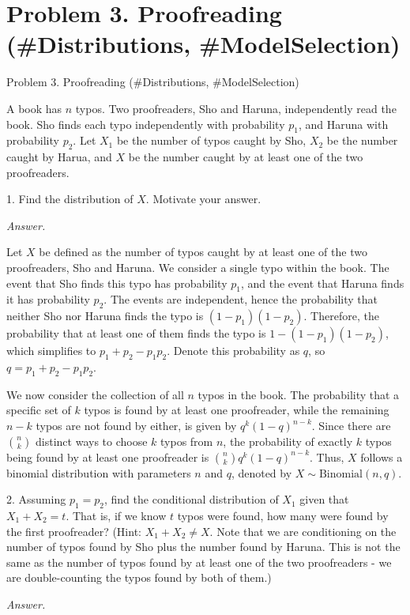 \documentclass[12pt]{article}
\begin{document}
\newpage
\section*{Problem 3. Proofreading (\#Distributions, \#ModelSelection)}

Problem 3. Proofreading (\#Distributions, \#ModelSelection)

A book has \(n\) typos. Two proofreaders, Sho and Haruna, independently read the book. Sho finds each typo independently with probability \(p_1\), and Haruna with probability \(p_2\). Let \(X_1\) be the number of typos caught by Sho, \(X_2\) be the number caught by Harua, and \(X\) be the number caught by at least one of the two proofreaders.

\begin{q}
1. Find the distribution of \(X\). Motivate your answer.
\end{q}
\textit{Answer.}

Let \( X \) be defined as the number of typos caught by at least one of the two proofreaders, Sho and Haruna. We consider a single typo within the book. The event that Sho finds this typo has probability \( p_1 \), and the event that Haruna finds it has probability \( p_2 \). The events are independent, hence the probability that neither Sho nor Haruna finds the typo is \( (1 - p_1)(1 - p_2) \). Therefore, the probability that at least one of them finds the typo is \( 1 - (1 - p_1)(1 - p_2) \), which simplifies to \( p_1 + p_2 - p_1p_2 \). Denote this probability as \( q \), so \( q = p_1 + p_2 - p_1p_2 \).

We now consider the collection of all \( n \) typos in the book. The probability that a specific set of \( k \) typos is found by at least one proofreader, while the remaining \( n - k \) typos are not found by either, is given by \( q^k(1 - q)^{n-k} \). Since there are \( \binom{n}{k} \) distinct ways to choose \( k \) typos from \( n \), the probability of exactly \( k \) typos being found by at least one proofreader is \( \binom{n}{k} q^k (1 - q)^{n-k} \). Thus, \( X \) follows a binomial distribution with parameters \( n \) and \( q \), denoted by \( X \sim \text{Binomial}(n, q) \).


\begin{q}
2. Assuming \(p_1=p_2\), find the conditional distribution of \(X_1\) given that \(X_1+X_2=t\). That is, if we know \(t\) typos were found, how many were found by the first proofreader? (Hint: \(X_1+X_2 \neq X\). Note that we are conditioning on the number of typos found by Sho plus the number found by Haruna. This is not the same as the number of typos found by at least one of the two proofreaders - we are double-counting the typos found by both of them.)
\end{q}
\textit{Answer.}
\end{document}
